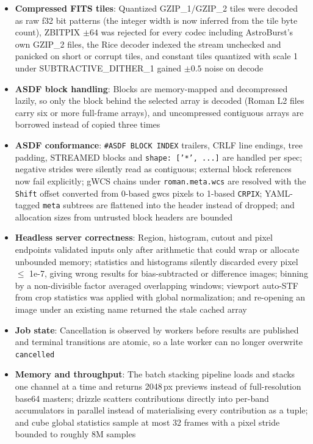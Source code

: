 \documentclass[11pt,a4paper]{article}
\newcommand{\code}[1]{\texttt{\small #1}}
\begin{document}
\begin{itemize}[nosep]
    \item \textbf{Compressed FITS tiles}: Quantized GZIP\_1/GZIP\_2 tiles were decoded as raw f32 bit patterns (the integer width is now inferred from the tile byte count), ZBITPIX $\pm 64$ was rejected for every codec including AstroBurst's own GZIP\_2 files, the Rice decoder indexed the stream unchecked and panicked on short or corrupt tiles, and constant tiles quantized with scale 1 under SUBTRACTIVE\_DITHER\_1 gained $\pm 0.5$ noise on decode
    \item \textbf{ASDF block handling}: Blocks are memory-mapped and decompressed lazily, so only the block behind the selected array is decoded (Roman L2 files carry six or more full-frame arrays), and uncompressed contiguous arrays are borrowed instead of copied three times
    \item \textbf{ASDF conformance}: \code{\#ASDF BLOCK INDEX} trailers, CRLF line endings, tree padding, STREAMED blocks and \code{shape: ['*', ...]} are handled per spec; negative strides were silently read as contiguous; external block references now fail explicitly; gWCS chains under \code{roman.meta.wcs} are resolved with the \code{Shift} offset converted from 0-based gwcs pixels to 1-based \code{CRPIX}; YAML-tagged \code{meta} subtrees are flattened into the header instead of dropped; and allocation sizes from untrusted block headers are bounded
    \item \textbf{Headless server correctness}: Region, histogram, cutout and pixel endpoints validated inputs only after arithmetic that could wrap or allocate unbounded memory; statistics and histograms silently discarded every pixel $\le$ 1e-7, giving wrong results for bias-subtracted or difference images; binning by a non-divisible factor averaged overlapping windows; viewport auto-STF from crop statistics was applied with global normalization; and re-opening an image under an existing name returned the stale cached array
    \item \textbf{Job state}: Cancellation is observed by workers before results are published and terminal transitions are atomic, so a late worker can no longer overwrite \code{cancelled}
    \item \textbf{Memory and throughput}: The batch stacking pipeline loads and stacks one channel at a time and returns 2048\,px previews instead of full-resolution base64 masters; drizzle scatters contributions directly into per-band accumulators in parallel instead of materialising every contribution as a tuple; and cube global statistics sample at most 32 frames with a pixel stride bounded to roughly 8M samples
    \end{itemize}
\end{document}
